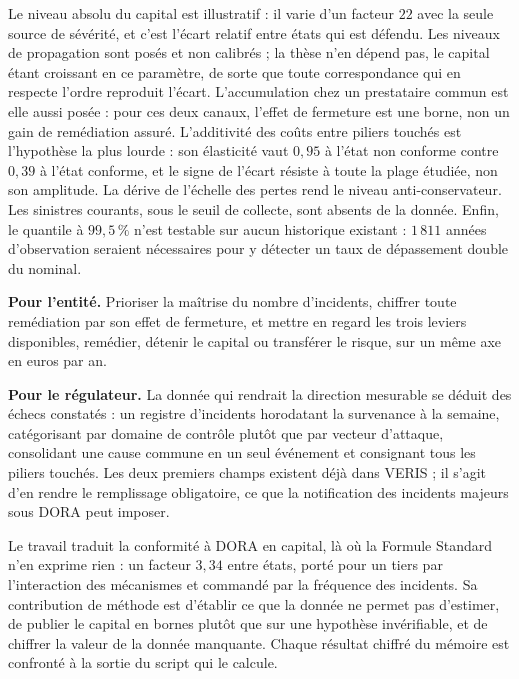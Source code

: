 Le niveau absolu du capital est illustratif : il varie d'un facteur $22$ avec la seule source de
sévérité, et c'est l'écart relatif entre états qui est défendu. Les niveaux de propagation sont
posés et non calibrés ; la thèse n'en dépend pas, le capital étant croissant en ce paramètre, de
sorte que toute correspondance qui en respecte l'ordre reproduit l'écart. L'accumulation chez un
prestataire commun est elle aussi posée : pour ces deux canaux, l'effet de fermeture est une borne,
non un gain de remédiation assuré. L'additivité des coûts
entre piliers touchés est l'hypothèse la plus lourde : son élasticité vaut $0{,}95$ à l'état non
conforme contre $0{,}39$ à l'état conforme, et le signe de l'écart résiste à toute la plage
étudiée, non son amplitude. La dérive de l'échelle des pertes rend le niveau anti-conservateur.
Les sinistres courants, sous le seuil de collecte, sont absents de la donnée. Enfin, le quantile à
$99{,}5\,\%$ n'est testable sur aucun historique existant : $1\,811$ années d'observation seraient
nécessaires pour y détecter un taux de dépassement double du nominal.

\textbf{Pour l'entité.} Prioriser la maîtrise du nombre d'incidents, chiffrer toute remédiation par
son effet de fermeture, et mettre en regard les trois leviers disponibles, remédier, détenir le
capital ou transférer le risque, sur un même axe en euros par an.

\textbf{Pour le régulateur.} La donnée qui rendrait la direction mesurable se déduit des échecs
constatés : un registre d'incidents horodatant la survenance à la semaine, catégorisant par domaine
de contrôle plutôt que par vecteur d'attaque, consolidant une cause commune en un seul
événement et consignant tous les piliers touchés. Les deux premiers champs existent déjà dans VERIS ; il s'agit d'en rendre le
remplissage obligatoire, ce que la notification des incidents majeurs sous DORA peut imposer.

Le travail traduit la conformité à DORA en capital, là où la Formule Standard n'en exprime rien :
un facteur $3{,}34$ entre états, porté pour un tiers par l'interaction des mécanismes et commandé
par la fréquence des incidents. Sa contribution de méthode est d'établir ce que la donnée ne
permet pas d'estimer, de publier le capital en bornes plutôt que sur une hypothèse invérifiable, et
de chiffrer la valeur de la donnée manquante. Chaque résultat chiffré du mémoire est confronté à la
sortie du script qui le calcule.

